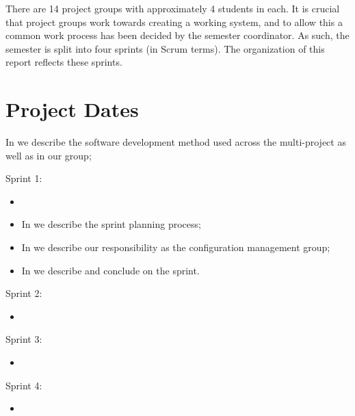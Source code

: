 There are 14 project groups with approximately 4 students in each. It is crucial that project groups work towards creating a working system, and to allow this a common work process has been decided by the semester coordinator. As such, the semester is split into four sprints (in Scrum terms).
The organization of this report reflects these sprints. 


\section{Project Dates}

\begin{documentorganization}
  \item In  we describe the software development method used across the multi-project as well as in our group;
  \item Sprint 1:
  \begin{itemize}
    \item {}
    \item In  we describe the sprint planning process;
    \item In  we describe our responsibility as the configuration management group;
    \item In  we describe and conclude on the sprint. 
  \end{itemize}
  \item Sprint 2:
  \begin{itemize}
    \item {}
  \end{itemize}
  \item Sprint 3:
  \begin{itemize}
    \item {}
  \end{itemize}
  \item Sprint 4:
  \begin{itemize}
    \item {}
  \end{itemize}
\end{documentorganization}